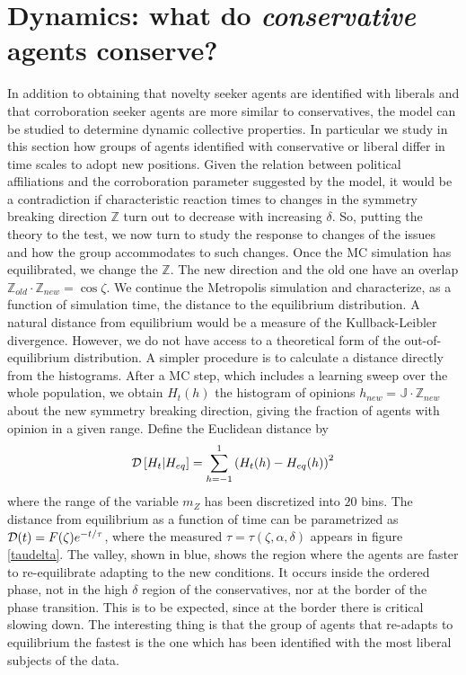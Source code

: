 \documentclass[twocolumn,showpacs]{revtex4-1}
\begin{document}
\section{Dynamics: what do {\it conservative } agents conserve?}
\label{sec:dyn} 
In addition to obtaining that novelty
seeker agents are identified with  liberals and that corroboration
seeker agents are more similar to conservatives, the model 
can be studied to determine dynamic collective properties. In particular
we study in this section how groups of 
agents identified with  conservative or liberal
differ in time scales to adopt new positions. Given the relation between political affiliations and  the corroboration parameter suggested by the model, it would  be a contradiction if characteristic reaction times
to changes in the symmetry breaking direction $\mathbb{Z}$ turn out to decrease with
increasing  $\delta$. 
So, putting the theory to the test,   we now turn to study 
the response to changes of the issues and how 
the group accommodates to such changes.
Once the MC simulation has equilibrated, we change the $\mathbb{Z}$. The
new direction and the old one have an overlap  $\mathbb{Z}_{old} 
\cdot \mathbb{Z}_{new}=\cos\zeta$. We continue the  Metropolis simulation
and characterize, as a function of simulation 
time, the distance to the equilibrium distribution. 
A natural distance  from equilibrium would be a measure
of the Kullback-Leibler divergence. However, we do not have access
to a theoretical form of the out-of-equilibrium distribution.
A simpler procedure is to calculate a distance directly
from the histograms. After a MC step, which includes a learning sweep
over the whole population, we obtain $H_{t}(h)$
the histogram of opinions 
$h_{new}=\mathbb{J}\cdot\mathbb{Z}_{new} $
about the new symmetry breaking direction, giving the fraction
of agents with opinion in a given range. Define the Euclidean distance by
\begin{equation}
{\cal D}\left[H_{t} | H_{eq}\right]= \sum_{h=-1}^{1}\left(H_{t}(h)- H_{eq}
(h)
\right)^2
\label{eq:dist2}
\end{equation}
where the range of the variable $m_Z$ has been discretized into $20$ bins.
The distance from equilibrium as a function of time can be
parametrized as ${\cal D}(t)= F(\zeta) e^{-t/\tau}$, 
where the measured $\tau=\tau(\zeta,\alpha,\delta)$ appears in figure \ref{taudelta}.
The valley, shown
in blue, shows the region where the agents are faster
to re-equilibrate adapting to the new conditions. It  occurs inside the ordered 
phase, not in the high $\delta$  region of the conservatives, nor at 
the border of the phase transition. This is to be expected, since at the border
there is critical slowing down. The interesting thing is that 
the group of agents that 
re-adapts to equilibrium the fastest is the one which
has been identified with the most liberal subjects of the data.
\end{document}
